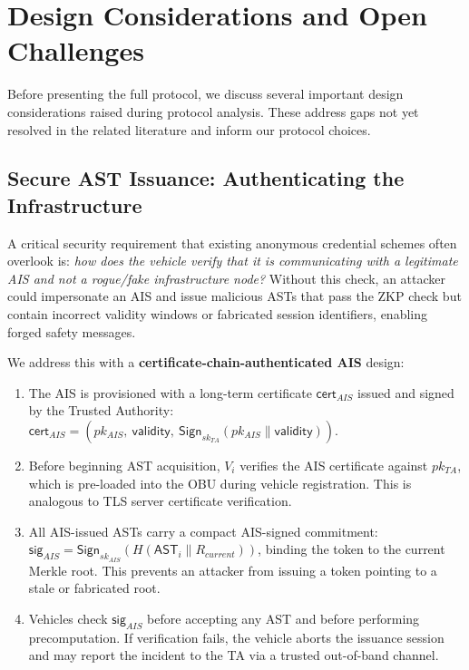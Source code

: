 \section{Design Considerations and Open Challenges}

Before presenting the full protocol, we discuss several important design
considerations raised during protocol analysis. These address gaps not yet resolved
in the related literature and inform our protocol choices.

\subsection{Secure AST Issuance: Authenticating the Infrastructure}
\label{sec:ast_issuance}

A critical security requirement that existing anonymous credential schemes often
overlook is: \emph{how does the vehicle verify that it is communicating with a
legitimate AIS and not a rogue/fake infrastructure node?} Without this check, an
attacker could impersonate an AIS and issue malicious ASTs that pass the ZKP check
but contain incorrect validity windows or fabricated session identifiers, enabling
forged safety messages.

We address this with a \textbf{certificate-chain-authenticated AIS} design:

\begin{enumerate}
    \item The AIS is provisioned with a long-term certificate $\mathsf{cert}_{AIS}$
    issued and signed by the Trusted Authority:
    $\mathsf{cert}_{AIS} = (pk_{AIS},\ \mathsf{validity},\ \mathsf{Sign}_{sk_{TA}}(pk_{AIS} \| \mathsf{validity}))$.

    \item Before beginning AST acquisition, $V_i$ verifies the AIS certificate
    against $pk_{TA}$, which is pre-loaded into the OBU during vehicle registration.
    This is analogous to TLS server certificate verification.

    \item All AIS-issued ASTs carry a compact AIS-signed commitment:
    $\mathsf{sig}_{AIS} = \mathsf{Sign}_{sk_{AIS}}(H(\mathsf{AST}_i \| R_{current}))$,
    binding the token to the current Merkle root. This prevents an attacker from
    issuing a token pointing to a stale or fabricated root.

    \item Vehicles check $\mathsf{sig}_{AIS}$ before accepting any AST and before
    performing precomputation. If verification fails, the vehicle aborts the
    issuance session and may report the incident to the TA via a trusted out-of-band
    channel.
\end{enumerate}

